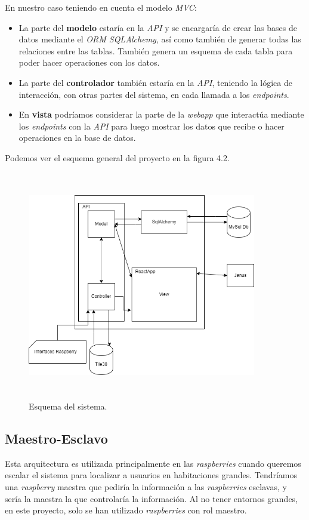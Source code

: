 En nuestro caso teniendo en cuenta el modelo \textit{MVC}\cite{mvc}:

\begin{itemize}
\item La parte del \textbf{modelo} estaría en la \textit{API} y se encargaría de crear las bases de datos mediante el \textit{ORM SQLAlchemy}, así como también de generar todas las relaciones entre las tablas. También genera un esquema de cada tabla para poder hacer operaciones con los datos.\item La parte del \textbf{controlador} también estaría en la \textit{API}, teniendo la lógica de interacción, con otras partes del sistema, en cada llamada a los \textit{endpoints}.
\item En \textbf{vista} podríamos considerar la parte de la \textit{webapp} que interactúa mediante los \textit{endpoints} con la \textit{API} para luego mostrar los datos que recibe o hacer operaciones en la base de datos.
\end{itemize}

Podemos ver el esquema general del proyecto en la figura 4.2.

\FloatBarrier
\begin{figure}[h]
    \centering
    \includegraphics[width=10cm,height=10cm,keepaspectratio]{img/Esquema general del proyecto.drawio (1).png}
    \caption{Esquema del sistema.}
    \label{fig:Esquema-del-sistema}
\end{figure}
\FloatBarrier

\subsection{Maestro-Esclavo}
Esta arquitectura es utilizada principalmente en las \textit{raspberries} cuando queremos escalar el sistema para localizar a usuarios en habitaciones grandes. Tendríamos una \textit{raspberry} maestra que pediría la información a las \textit{raspberries} esclavas, y sería la maestra la que controlaría la información. Al no tener entornos grandes, en este proyecto, solo se han utilizado \textit{raspberries} con rol maestro.

